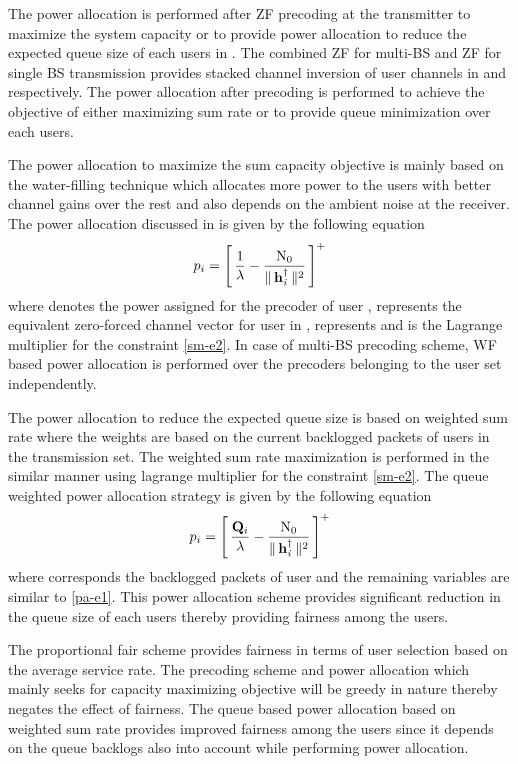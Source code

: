 
The power allocation is performed after ZF precoding at the transmitter to maximize the system capacity or to provide power allocation to reduce the expected queue size of each users in . The combined ZF for multi-BS and ZF for single BS transmission provides stacked channel inversion of user channels in  and  respectively. The power allocation after precoding is performed to achieve the objective of either maximizing sum rate or to provide queue minimization over each users.

The power allocation to maximize the sum capacity objective is mainly based on the water-filling technique which allocates more power to the users with better channel gains over the rest and also depends on the ambient noise at the receiver. The power allocation discussed in \cite{tse2005fundamentals} is given by the following equation 
\begin{equation}
p_i = \left [ \, \frac{1}{\lambda} - \frac{\text{N}_{0}}{\|\, \mathbf{h}_{\mathit{i}}^{\dag} \,\|^2} \, \right ]^+
\label{pa-e1}
\end{equation} 
where  denotes the power assigned for the precoder of user ,  represents the equivalent zero-forced channel vector for  user in , \me{[x]^+} represents  and \me{\lambda} is the Lagrange multiplier for the constraint \eqref{sm-e2}. In case of multi-BS precoding scheme, WF based power allocation is performed over the precoders belonging to the user set  independently.

The power allocation to reduce the expected queue size is based on weighted sum rate where the weights are based on the current backlogged packets of users in the transmission set. The weighted sum rate maximization is performed in the similar manner using lagrange multiplier for the constraint \eqref{sm-e2}. The queue weighted power allocation strategy is given by the following equation  
\begin{equation}
p_i = \left [ \, \frac{\mathbf{Q}_i}{\lambda} - \frac{\text{N}_{0}}{\|\, \mathbf{h}_{\mathit{i}}^{\dag} \,\|^2} \, \right ]^+
\label{pa-e2}
\end{equation} 
where  corresponds the backlogged packets of user  and the remaining variables are similar to \eqref{pa-e1}. This power allocation scheme provides significant reduction in the queue size of each users thereby providing fairness among the users.

The proportional fair scheme provides fairness in terms of user selection based on the average service rate. The precoding scheme and power allocation which mainly seeks for capacity maximizing objective will be greedy in nature thereby negates the effect of fairness. The queue based power allocation based on weighted sum rate provides improved fairness among the users since it depends on the queue backlogs also into account while performing power allocation. 